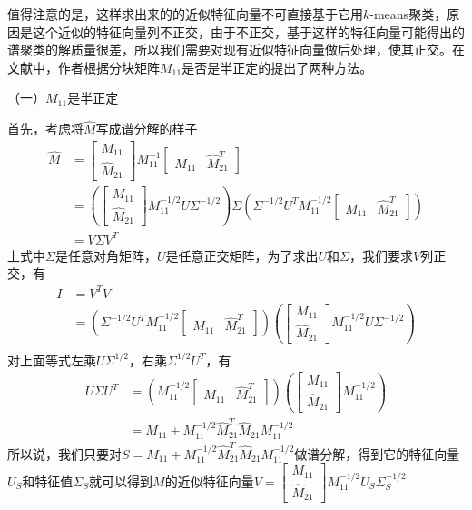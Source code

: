 值得注意的是，这样求出来的的近似特征向量不可直接基于它用$k$-means聚类，原因是这个近似的特征向量列不正交，由于不正交，基于这样的特征向量可能得出的谱聚类的解质量很差，所以我们需要对现有近似特征向量做后处理，使其正交。在文献\cite{fowlkes2004spectral}中，作者根据分块矩阵$M_{11}$是否是半正定的提出了两种方法。

（一）$M_{11}$是半正定

首先，考虑将$\hat{M}$写成谱分解的样子
\begin{align*}
    \hat{M} &= \begin{bmatrix}
        M_{11} \\ \hat{M}_{21}
    \end{bmatrix} M_{11}^{-1}
    \begin{bmatrix}
        M_{11} & \hat{M}_{21}^T
    \end{bmatrix} \\
    &= \left( \begin{bmatrix}
        M_{11} \\ \hat{M}_{21}
    \end{bmatrix} M_{11}^{-1/2} U \Sigma^{-1/2} \right) \Sigma \left( \Sigma^{-1/2} U^T M_{11}^{-1/2} \begin{bmatrix}
        M_{11} & \hat{M}_{21}^T \end{bmatrix} \right) \\
    &= V\Sigma V^T
\end{align*}
上式中$\Sigma$是任意对角矩阵，$U$是任意正交矩阵，为了求出$U$和$\Sigma$，我们要求$V$列正交，有
\begin{align*}
    I &= V^T V \\
    &= \left( \Sigma^{-1/2} U^T M_{11}^{-1/2} \begin{bmatrix}
        M_{11} & \hat{M}_{21}^T \end{bmatrix} \right) \left( \begin{bmatrix}
        M_{11} \\ \hat{M}_{21} \end{bmatrix} M_{11}^{-1/2} U \Sigma^{-1/2} \right) \\
\end{align*}
对上面等式左乘$U \Sigma^{1/2}$，右乘$\Sigma^{1/2} U^T$，有
\begin{align*}
    U\Sigma U^T &= \left( M_{11}^{-1/2} \begin{bmatrix}
        M_{11} & \hat{M}_{21}^T \end{bmatrix} \right) \left( \begin{bmatrix}
        M_{11} \\ \hat{M}_{21} \end{bmatrix} M_{11}^{-1/2} \right) \\
        &= M_{11} + M_{11}^{-1/2} \hat{M}_{21}^T \hat{M}_{21} M_{11}^{-1/2}
\end{align*}
所以说，我们只要对$S = M_{11} + M_{11}^{-1/2} \hat{M}_{21}^T \hat{M}_{21} M_{11}^{-1/2}$做谱分解，得到它的特征向量$U_S$和特征值$\Sigma_S$就可以得到$M$的近似特征向量$V = \begin{bmatrix} M_{11} \\ \hat{M}_{21} \end{bmatrix} M_{11}^{-1/2} U_S \Sigma_S^{-1/2}$

